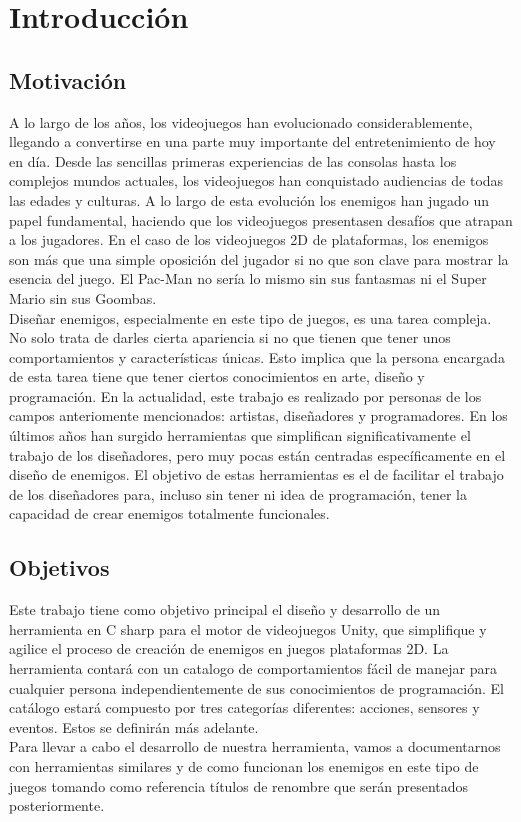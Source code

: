 \chapter{Introducción}
\label{cap:introduccion}


\section{Motivación}
A lo largo de los años, los videojuegos han evolucionado considerablemente, llegando a convertirse en una parte muy importante del entretenimiento de hoy en día. Desde las sencillas primeras experiencias de las consolas hasta los complejos mundos actuales, los videojuegos han conquistado audiencias de todas las edades y culturas. A lo largo de esta evolución los enemigos han jugado un papel fundamental, haciendo que los videojuegos presentasen desafíos que atrapan a los jugadores. 
En el caso de los videojuegos 2D de plataformas, los enemigos son más que una simple oposición del jugador si no que son clave para mostrar la esencia del juego. El Pac-Man no sería lo mismo sin sus fantasmas ni el Super Mario sin sus Goombas. \\
Diseñar enemigos, especialmente en este tipo de juegos, es una tarea compleja. No solo trata de darles cierta apariencia si no que tienen que tener unos comportamientos y características únicas.  Esto implica que la persona encargada de esta tarea tiene que tener ciertos conocimientos en arte, diseño y programación. En la actualidad, este trabajo es realizado por personas de los campos anteriomente mencionados: artistas, diseñadores y programadores.
En los últimos años han surgido herramientas que simplifican significativamente el trabajo de los diseñadores, pero muy pocas están centradas específicamente en el diseño de enemigos. El objetivo de estas herramientas es el de facilitar el trabajo de los diseñadores para, incluso sin tener ni idea de programación, tener la capacidad de crear enemigos totalmente funcionales.


\section{Objetivos}
Este trabajo tiene como objetivo principal el diseño y desarrollo de un herramienta en C sharp para el motor de videojuegos Unity, que simplifique y agilice el proceso de creación de enemigos en juegos plataformas 2D. La herramienta contará con un catalogo de comportamientos fácil de manejar para cualquier persona independientemente de sus conocimientos de programación. El catálogo estará compuesto por tres categorías diferentes: acciones, sensores y eventos. Estos se definirán más adelante. \\
Para llevar a cabo el desarrollo de nuestra herramienta, vamos a documentarnos con herramientas similares y de como funcionan los enemigos en este tipo de juegos tomando como referencia títulos de renombre que serán presentados posteriormente.


